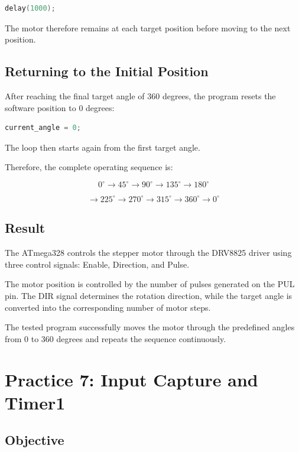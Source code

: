 \documentclass[12pt,a4paper]{article}
\begin{document}
\begin{lstlisting}[language=C]
delay(1000);
\end{lstlisting}

The motor therefore remains at each target position before moving to
the next position.

\subsection{Returning to the Initial Position}

After reaching the final target angle of 360 degrees, the program
resets the software position to 0 degrees:

\begin{lstlisting}[language=C]
current_angle = 0;
\end{lstlisting}

The loop then starts again from the first target angle.

Therefore, the complete operating sequence is:

\[
0^\circ
\rightarrow
45^\circ
\rightarrow
90^\circ
\rightarrow
135^\circ
\rightarrow
180^\circ
\]

\[
\rightarrow
225^\circ
\rightarrow
270^\circ
\rightarrow
315^\circ
\rightarrow
360^\circ
\rightarrow
0^\circ
\]

\subsection{Result}

The ATmega328 controls the stepper motor through the DRV8825 driver
using three control signals: Enable, Direction, and Pulse.

The motor position is controlled by the number of pulses generated on
the PUL pin. The DIR signal determines the rotation direction, while
the target angle is converted into the corresponding number of motor
steps.

The tested program successfully moves the motor through the predefined
angles from 0 to 360 degrees and repeats the sequence continuously.


\section{Practice 7: Input Capture and Timer1}

\subsection{Objective}
\end{document}
